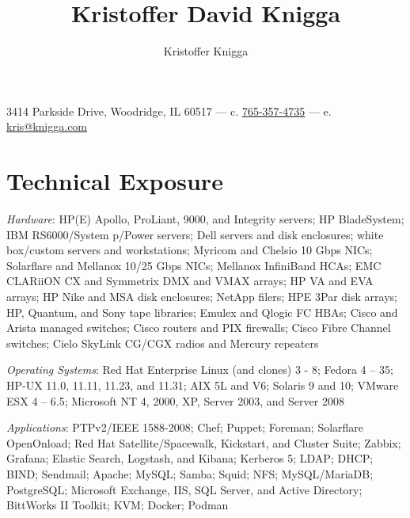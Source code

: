\documentclass[9pt]{extarticle} %
\title{Kristoffer David Knigga}
\author{Kristoffer Knigga}
\begin{document}



3414 Parkside Drive, Woodridge, IL 60517 \hfill --- \hfill c. \href{tel:765-357-4735}{765-357-4735} \hfill --- \hfill e. \href{mailto:kris@knigga.com}{kris@knigga.com}


\section{Technical Exposure}

\textit{Hardware}: HP(E) Apollo, ProLiant, 9000, and Integrity servers; HP BladeSystem; IBM RS6000/System p/Power servers; Dell servers and disk enclosures; white box/custom servers and workstations; Myricom and Chelsio 10 Gbps NICs; Solarflare and Mellanox 10/25 Gbps NICs; Mellanox InfiniBand HCAs; EMC CLARiiON CX and Symmetrix DMX and VMAX arrays; HP VA and EVA arrays; HP Nike and MSA disk enclosures; NetApp filers; HPE 3Par disk arrays; HP, Quantum, and Sony tape libraries; Emulex and Qlogic FC HBAs; Cisco and Arista managed switches; Cisco routers and PIX firewalls; Cisco Fibre Channel switches; Cielo SkyLink CG/CGX radios and Mercury repeaters
\bigskip

\textit{Operating Systems}: Red Hat Enterprise Linux (and clones) 3 - 8; Fedora 4 -- 35; HP-UX 11.0, 11.11, 11.23, and 11.31; AIX 5L and V6; Solaris 9 and 10; VMware ESX 4 -- 6.5; Microsoft NT 4, 2000, XP, Server 2003, and Server 2008

\bigskip

\textit{Applications}: PTPv2/IEEE 1588-2008; Chef; Puppet; Foreman; Solarflare OpenOnload; Red Hat Satellite/Spacewalk, Kickstart, and Cluster Suite; Zabbix; Grafana; Elastic Search, Logstash, and Kibana; Kerberos 5; LDAP; DHCP; BIND; Sendmail; Apache; MySQL; Samba; Squid; NFS; MySQL/MariaDB; PostgreSQL; Microsoft Exchange, IIS, SQL Server, and Active Directory; BittWorks II Toolkit; KVM; Docker; Podman

\bigskip
\end{document}
